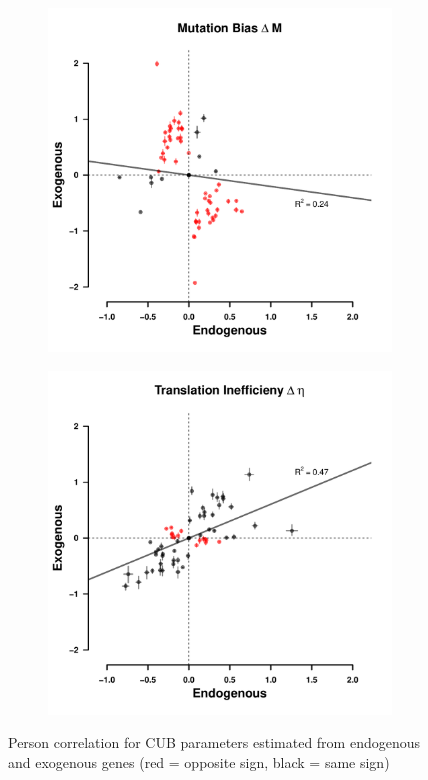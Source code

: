 \documentclass[12pt]{article}
\begin{document}
\begin{figure}[H]
    \centering
    \begin{subfigure}
        \centering
        \includegraphics[width=.45\textwidth]{img/csp_corr_dm.pdf}
    \end{subfigure}
    \begin{subfigure}
        \centering
        \includegraphics[width=.45\textwidth]{img/csp_corr_deta.pdf}
    \end{subfigure}
    \caption{Person correlation for CUB parameters estimated from endogenous and exogenous genes (red = opposite sign, black = same sign)}
    \label{fig:csp_comp}
\end{figure}
\end{document}
